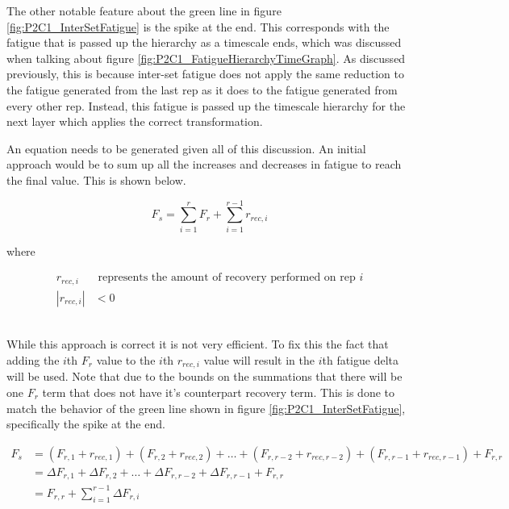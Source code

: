 The other notable feature about the green line in figure \ref{fig:P2C1_InterSetFatigue} is the spike at the end. This corresponds with the fatigue that is passed up the hierarchy as a timescale ends, which was discussed when talking about figure \ref{fig:P2C1_FatigueHierarchyTimeGraph}. As discussed previously, this is because inter-set fatigue does not apply the same reduction to the fatigue generated from the last rep as it does to the fatigue generated from every other rep. Instead, this fatigue is passed up the timescale hierarchy for the next layer which applies the correct transformation.

An equation needs to be generated given all of this discussion. An initial approach would be to sum up all the increases and decreases in fatigue to reach the final value. This is shown below.

\begin{minipage}{\textwidth}
	\begin{equation*}
		F_s=\sum_{i=1}^r F_r+\sum_{i=1}^{r-1} r_{rec,i}
	\end{equation*}
	\centerline{where}
	\begin{equation*}
		\begin{split}
			r_{rec,i} & \text{ represents the amount of recovery performed on rep }i \\
			|r_{rec,i}| & < 0
		\end{split}
	\end{equation*}
\end{minipage}\\

While this approach is correct it is not very efficient. To fix this the fact that adding the $i$th $F_r$ value to the $i$th $r_{rec,i}$ value will result in the $i$th fatigue delta will be used. Note that due to the bounds on the summations that there will be one $F_r$ term that does not have it's counterpart recovery term. This is done to match the behavior of the green line shown in figure \ref{fig:P2C1_InterSetFatigue}, specifically the spike at the end.

\begin{equation*}
	\begin{split}
		F_s & =
		\left( F_{r,1}+r_{rec,1} \right)+
		\left( F_{r,2}+r_{rec,2} \right)+
		\dots +
		\left( F_{r,r-2}+r_{rec,r-2} \right)+
		\left( F_{r,r-1}+r_{rec,r-1} \right)+
		F_{r,r}
		\\
		& = \Delta F_{r,1} +
		\Delta F_{r,2} +
		\dots +
		\Delta F_{r,r-2} +
		\Delta F_{r,r-1}+
		F_{r,r}
		\\
		& = F_{r,r}+\sum_{i=1}^{r-1}\Delta F_{r,i}
	\end{split}
\end{equation*}

